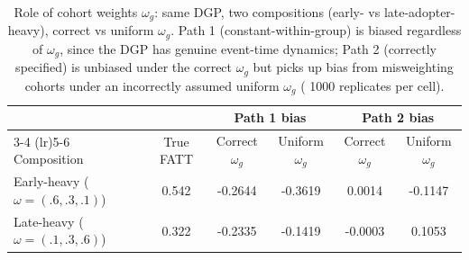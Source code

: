 \begin{table}[htbp]
\centering
\caption{Role of cohort weights $\omega_g$: same DGP, two compositions (early- vs late-adopter-heavy), correct vs uniform $\omega_g$. Path 1 (constant-within-group) is biased regardless of $\omega_g$, since the DGP has genuine event-time dynamics; Path 2 (correctly specified) is unbiased under the correct $\omega_g$ but picks up bias from misweighting cohorts under an incorrectly assumed uniform $\omega_g$ (
1000
 replicates per cell).}
\label{tab:omega}
\begin{tabular}{lc cc cc}
\toprule
& & \multicolumn{2}{c}{Path 1 bias} & \multicolumn{2}{c}{Path 2 bias} \\
\cmidrule(lr){3-4} \cmidrule(lr){5-6}
Composition & True FATT & Correct $\omega_g$ & Uniform $\omega_g$ & Correct $\omega_g$ & Uniform $\omega_g$ \\
\midrule
Early-heavy ($\omega=(.6,.3,.1)$) & 0.542 & -0.2644 & -0.3619 & 0.0014 & -0.1147 \\
Late-heavy ($\omega=(.1,.3,.6)$) & 0.322 & -0.2335 & -0.1419 & -0.0003 & 0.1053 \\
\bottomrule
\end{tabular}
\end{table}
